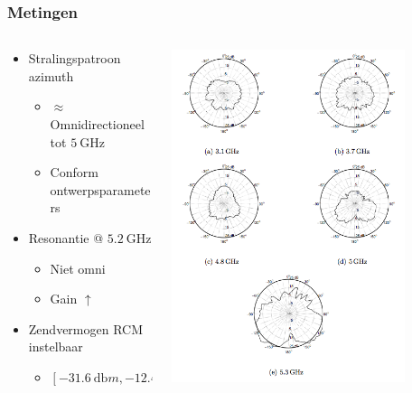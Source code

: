 \documentclass{beamer}
\begin{document}
  \begin{frame}
  \frametitle{Metingen}
  	\begin{columns}[c]
  	\begin{column}{0.5\textwidth}
  		\begin{itemize}
  			\item Stralingspatroon azimuth
  			\begin{itemize}
  				\item $\approx$ Omnidirectioneel tot $\SI{5}{\giga\hertz}$
  				\item Conform ontwerpsparameters\\
  			\end{itemize}
  			\item Resonantie @ $\SI{5.2}{\giga\hertz}$
  			\begin{itemize}
  				\item Niet omni
  				\item Gain $\uparrow$
  			\end{itemize}
  			\item Zendvermogen RCM instelbaar
  			\begin{itemize}
  				\item $[\SI{-31.6}{\decibel}m , \SI{-12.46}{\decibel}m]$
  			\end{itemize}
  		\end{itemize}
  	\end{column}
  	\begin{column}{0.5\textwidth}
  		\includegraphics[width=0.8\textwidth]{images/ant_rad_pat.png}
  	\end{column}
  	\end{columns}
  \end{frame}
\end{document}
